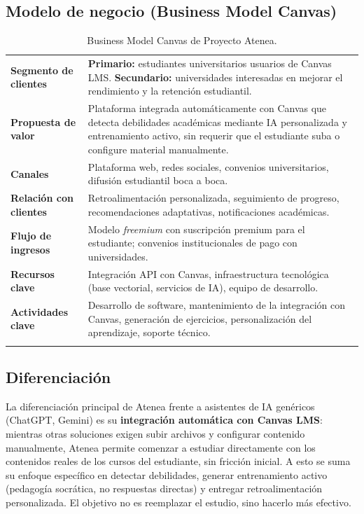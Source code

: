 \documentclass[11pt,a4paper]{article}
\begin{document}
\subsection{Modelo de negocio (Business Model Canvas)}

\begin{longtable}{@{}>{\bfseries}p{4.2cm} p{10.3cm}@{}}
\toprule
Segmento de clientes & \textbf{Primario:} estudiantes universitarios usuarios de Canvas LMS. \textbf{Secundario:} universidades interesadas en mejorar el rendimiento y la retenci\'on estudiantil. \\
Propuesta de valor & Plataforma integrada autom\'aticamente con Canvas que detecta debilidades acad\'emicas mediante IA personalizada y entrenamiento activo, sin requerir que el estudiante suba o configure material manualmente. \\
Canales & Plataforma web, redes sociales, convenios universitarios, difusi\'on estudiantil boca a boca. \\
Relaci\'on con clientes & Retroalimentaci\'on personalizada, seguimiento de progreso, recomendaciones adaptativas, notificaciones acad\'emicas. \\
Flujo de ingresos & Modelo \emph{freemium} con suscripci\'on premium para el estudiante; convenios institucionales de pago con universidades. \\
Recursos clave & Integraci\'on API con Canvas, infraestructura tecnol\'ogica (base vectorial, servicios de IA), equipo de desarrollo. \\
Actividades clave & Desarrollo de software, mantenimiento de la integraci\'on con Canvas, generaci\'on de ejercicios, personalizaci\'on del aprendizaje, soporte t\'ecnico. \\
\bottomrule
\caption{Business Model Canvas de Proyecto Atenea.}
\end{longtable}

\subsection{Diferenciaci\'on}

La diferenciaci\'on principal de Atenea frente a asistentes de IA gen\'ericos (ChatGPT, Gemini) es su \textbf{integraci\'on autom\'atica con Canvas LMS}: mientras otras soluciones exigen subir archivos y configurar contenido manualmente, Atenea permite comenzar a estudiar directamente con los contenidos reales de los cursos del estudiante, sin fricci\'on inicial. A esto se suma su enfoque espec\'ifico en detectar debilidades, generar entrenamiento activo (pedagog\'ia socr\'atica, no respuestas directas) y entregar retroalimentaci\'on personalizada. El objetivo no es reemplazar el estudio, sino hacerlo m\'as efectivo.
\end{document}
